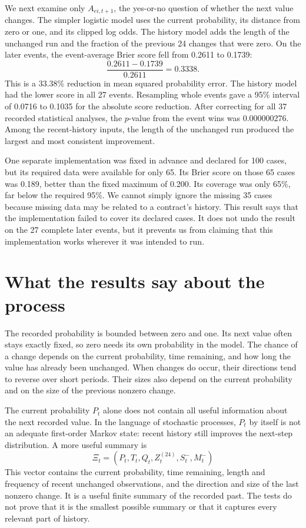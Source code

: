 \documentclass[10pt,twoside]{article}
\begin{document}
We next examine only $A_{e i,t+1}$, the yes-or-no question of whether the next value changes. The simpler logistic model uses the current probability, its distance from zero or one, and its clipped log odds. The history model adds the length of the unchanged run and the fraction of the previous 24 changes that were zero. On the later events, the event-average Brier score fell from 0.2611 to 0.1739:
\begin{equation}
  \frac{0.2611-0.1739}{0.2611}=0.3338.
  \label{eq:brier-reduction}
\end{equation}
This is a 33.38\% reduction in mean squared probability error. The history model had the lower score in all 27 events. Resampling whole events gave a 95\% interval of 0.0716 to 0.1035 for the absolute score reduction. After correcting for all 37 recorded statistical analyses, the $p$-value from the event wins was 0.000000276. Among the recent-history inputs, the length of the unchanged run produced the largest and most consistent improvement.

One separate implementation was fixed in advance and declared for 100 cases, but its required data were available for only 65. Its Brier score on those 65 cases was 0.189, better than the fixed maximum of 0.200. Its coverage was only 65\%, far below the required 95\%. We cannot simply ignore the missing 35 cases because missing data may be related to a contract's history. This result says that the implementation failed to cover its declared cases. It does not undo the result on the 27 complete later events, but it prevents us from claiming that this implementation works wherever it was intended to run.

\section{What the results say about the process}

The recorded probability is bounded between zero and one. Its next value often stays exactly fixed, so zero needs its own probability in the model. The chance of a change depends on the current probability, time remaining, and how long the value has already been unchanged. When changes do occur, their directions tend to reverse over short periods. Their sizes also depend on the current probability and on the size of the previous nonzero change.

The current probability $P_t$ alone does not contain all useful information about the next recorded value. In the language of stochastic processes, $P_t$ by itself is not an adequate first-order Markov state: recent history still improves the next-step distribution. A more useful summary is
\begin{equation}
  \Xi_t=(P_t,T_t,Q_t,Z_t^{(24)},S_t^{-},M_t^{-})
  \label{eq:augmented-state}
\end{equation}
This vector contains the current probability, time remaining, length and frequency of recent unchanged observations, and the direction and size of the last nonzero change. It is a useful finite summary of the recorded past. The tests do not prove that it is the smallest possible summary or that it captures every relevant part of history.
\end{document}
